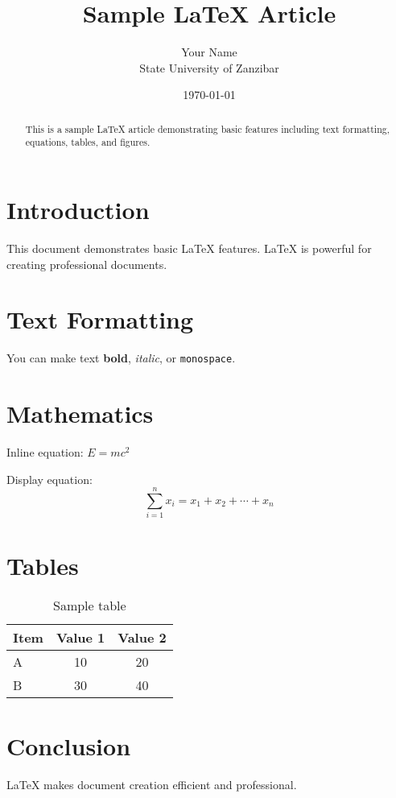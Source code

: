 \documentclass[12pt, a4paper]{article}
\title{Sample LaTeX Article}
\author{Your Name \\ State University of Zanzibar}
\date{\today}
\begin{document}
\maketitle

\begin{abstract}
This is a sample LaTeX article demonstrating basic features including text formatting, equations, tables, and figures.
\end{abstract}

\section{Introduction}
This document demonstrates basic LaTeX features. LaTeX is powerful for creating professional documents.

\section{Text Formatting}
You can make text \textbf{bold}, \textit{italic}, or \texttt{monospace}.

\section{Mathematics}
Inline equation: $E = mc^2$

Display equation:
\begin{equation}
    \sum_{i=1}^{n} x_i = x_1 + x_2 + \cdots + x_n
\end{equation}

\section{Tables}
\begin{table}[h]
\centering
\caption{Sample table}
\begin{tabular}{|l|c|c|}
\hline
Item & Value 1 & Value 2 \\
\hline
A & 10 & 20 \\
B & 30 & 40 \\
\hline
\end{tabular}
\end{table}

\section{Conclusion}
LaTeX makes document creation efficient and professional.
\end{document}
